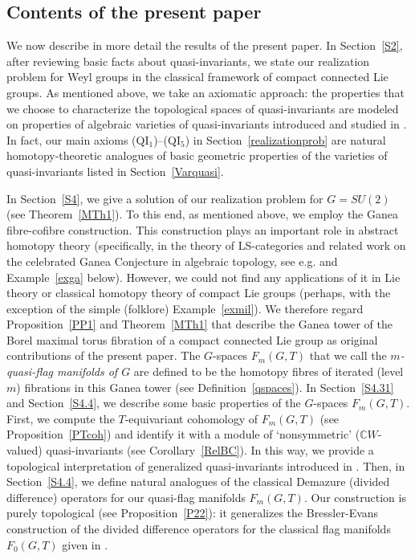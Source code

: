 \documentclass[11pt]{amsart}
\theoremstyle{definition}
\theoremstyle{remark}
\numberwithin{equation}{section}
\def\C{\mathbb C}
\begin{document}
\subsection*{Contents of the present paper}
We now describe in more detail the results of the present paper. 
In Section~\ref{S2}, after  reviewing basic facts about quasi-invariants, we state our realization problem for Weyl groups in the classical framework of compact connected Lie groups. As mentioned above, we take an axiomatic approach: the properties that we choose to characterize the topological spaces of quasi-invariants are modeled on properties of algebraic varieties of quasi-invariants introduced and studied in \cite{BEG03}.
In fact, our main axioms (QI${}_1$)--(QI${}_5$) in
Section~\ref{realizationprob} are natural homotopy-theoretic analogues of basic geometric properties of the varieties of quasi-invariants listed in Section~\ref{Varquasi}.

In Section~\ref{S4}, we give a solution of our realization problem for $ G = SU(2) $ (see Theorem~\ref{MTh1}). To this end, as mentioned above, we employ the Ganea fibre-cofibre construction. This construction plays an important role in abstract homotopy theory (specifically, in the theory of LS-categories and related work on the celebrated Ganea Conjecture in algebraic topology, see e.g. \cite{CLOT03} and Example~\ref{exga} below). However, we could not find any applications of it in Lie theory or classical homotopy theory of compact Lie groups (perhaps, with the exception of the simple (folklore) Example~\ref{exmil}). We therefore regard Proposition~\ref{PP1} and Theorem~\ref{MTh1}  that describe the Ganea tower of the Borel maximal torus fibration of a compact connected Lie group as original contributions of the present paper. The $G$-spaces $ F_m(G,T) $ that we call the {\it $m$-quasi-flag manifolds of $G$} are defined to be the homotopy fibres of  
iterated (level $m$) fibrations in this Ganea tower (see Definition~\ref{qspaces}). In Section~\ref{S4.31} and Section~\ref{S4.4}, we describe some basic properties of the
$G$-spaces $F_m(G,T)$. First, we compute the $T$-equivariant cohomology of $ F_m(G,T) $ (see Proposition~\ref{PTcoh}) and identify it with a module of `nonsymmetric' ($\C W$-valued) quasi-invariants (see Corollary~\ref{RelBC}). In this way, we provide a topological interpretation of generalized quasi-invariants  introduced in \cite{BC11}.
Then, in Section~\ref{S4.4},  we define natural analogues of the classical Demazure (divided difference) operators for our quasi-flag manifolds $F_m(G,T)$. Our construction is purely topological (see Proposition~\ref{P22}): it generalizes the Bressler-Evans construction of the divided difference operators for the classical flag manifolds $ F_0(G,T) $ given in \cite{BE90}. 
\end{document}
